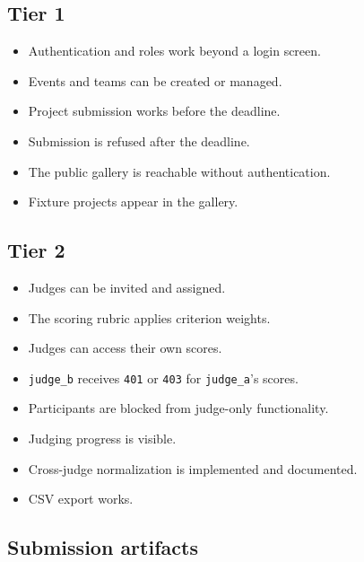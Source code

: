 \documentclass[11pt]{article}
\newcommand{\checkbox}{\textcolor{DeepBlue}{\ding{113}}}
\begin{document}
\subsection{Tier 1}

\begin{itemize}
  \item[\checkbox] Authentication and roles work beyond a login screen.
  \item[\checkbox] Events and teams can be created or managed.
  \item[\checkbox] Project submission works before the deadline.
  \item[\checkbox] Submission is refused after the deadline.
  \item[\checkbox] The public gallery is reachable without authentication.
  \item[\checkbox] Fixture projects appear in the gallery.
\end{itemize}

\subsection{Tier 2}

\begin{itemize}
  \item[\checkbox] Judges can be invited and assigned.
  \item[\checkbox] The scoring rubric applies criterion weights.
  \item[\checkbox] Judges can access their own scores.
  \item[\checkbox] \texttt{judge\_b} receives \texttt{401} or \texttt{403} for \texttt{judge\_a}'s scores.
  \item[\checkbox] Participants are blocked from judge-only functionality.
  \item[\checkbox] Judging progress is visible.
  \item[\checkbox] Cross-judge normalization is implemented and documented.
  \item[\checkbox] CSV export works.
\end{itemize}

\subsection{Submission artifacts}
\end{document}
